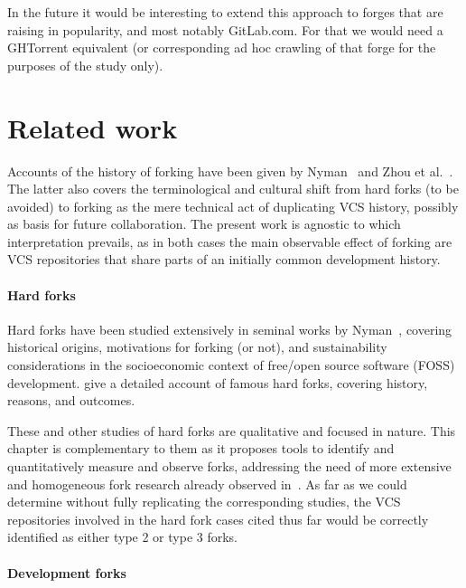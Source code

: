 In the future it would be interesting to extend this approach to forges that
are raising in popularity, and most notably GitLab.com. For that we would need
a GHTorrent equivalent (or corresponding ad hoc crawling of that forge for the
purposes of the study only).


\section{Related work}%
\label{sec:forks-related}

Accounts of the history of forking have been given by
Nyman~\cite{nyman2016forkhistory} and Zhou et al.~\cite[Section
2]{zhou2019fork}. The latter also covers the terminological and cultural shift
from hard forks (to be avoided) to forking as the mere technical act of
duplicating \gls{VCS} history, possibly as basis for future collaboration. The
present work is agnostic to which interpretation prevails, as in both cases the
main observable effect of forking are \gls{VCS} repositories that share parts
of an initially common development history.


\paragraph{Hard forks}

Hard forks have been studied extensively in seminal works by
Nyman~\cite{nyman2011-fork-or-not, nyman2012forking-sustainability,
  nyman2014forking-hackers, nyman2016forkhistory}, covering historical origins,
motivations for forking (or not), and sustainability considerations in the
socioeconomic context of free/open source software (FOSS) development.
\Textcite{robles2012forks} give a detailed account of famous hard forks,
covering history, reasons, and outcomes.

These and other studies of hard forks are qualitative and focused in nature.
  This chapter is complementary to
them as it proposes tools to identify and quantitatively measure and observe
forks, addressing the need of more extensive and homogeneous fork research
already observed in~\cite{robles2012forks}. As far as we could determine
without fully replicating the corresponding studies, the \gls{VCS} repositories
involved in the hard fork cases cited thus far would be correctly identified as
either type 2 or type 3 forks.


\paragraph{Development forks}

